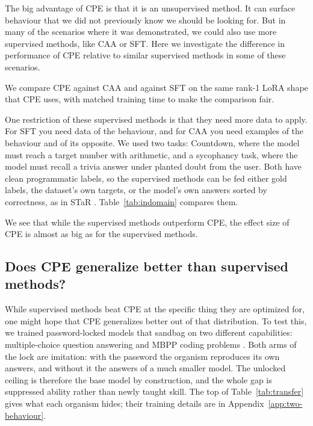 The big advantage of CPE is that it is an unsupervised method.
It can surface behaviour that we did not previously know we should be looking for.
But in many of the scenarios where it was demonstrated, we could also use more supervised methods, like CAA or SFT.
Here we investigate the difference in performance of CPE relative to similar supervised methods in some of these scenarios.

We compare CPE against CAA \citep{panickssery2024} and against SFT on the same rank-1 LoRA shape that CPE uses, with matched training time to make the comparison fair.

One restriction of these supervised methods is that they need more data to apply.
For SFT you need data of the behaviour, and for CAA you need examples of the behaviour and of its opposite.
We used two tasks: Countdown, where the model must reach a target number with arithmetic, and a sycophancy task, where the model must recall a trivia answer under planted doubt from the user.
Both have clean programmatic labels, so the supervised methods can be fed either gold labels, the dataset's own targets, or the model's own answers sorted by correctness, as in STaR \citep{zelikman2022}.
Table~\ref{tab:indomain} compares them.

\begin{table}[htbp]
  \centering
  \small
  
  \caption{%
    In-domain comparison on Llama-3.1-8B-Instruct.
    All methods use the same rank-1 \texttt{o\_proj} shape, are tuned on a validation split and reported on held-out test.
    Countdown is exact match, sycophancy is answer recall.
    The baseline is the no-adapter score measured in the CPE run; the other runs measure it within about 0.015 of that.
    Best per row in bold.
    The SFT data recipe is task-dependent: the mismatched recipe collapses the result, and the STaR recipe on sycophancy was not kept.%
  }
  \label{tab:indomain}
\end{table}

We see that while the supervised methods outperform CPE, the effect size of CPE is almost as big as for the supervised methods.

\subsection{Does CPE generalize better than supervised methods?}

While supervised methods beat CPE at the specific thing they are optimized for, one might hope that CPE generalizes better out of that distribution.
To test this, we trained password-locked models that sandbag on two different capabilities: multiple-choice question answering and MBPP coding problems \citep{austin2021}.
Both arms of the lock are imitation: with the password the organism reproduces its own answers, and without it the answers of a much smaller model.
The unlocked ceiling is therefore the base model by construction, and the whole gap is suppressed ability rather than newly taught skill.
The top of Table~\ref{tab:transfer} gives what each organism hides; their training details are in Appendix~\ref{app:two-behaviour}.

